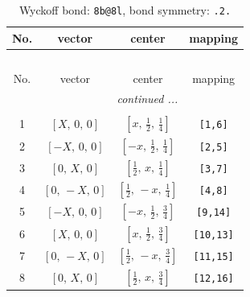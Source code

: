 \documentclass[fleqn,8pt]{jsarticle}
\begin{document}
\begin{longtable}{cccc}
\caption{Wyckoff bond: {\tt 8b@8l}, bond symmetry: {\tt .2.}}
 \\
 \hline \hline
No. & vector & center & mapping \\ \hline \endfirsthead

\multicolumn{3}{l}{\tablename\ \thetable{}} \\
 \hline \hline
No. & vector & center & mapping \\ \hline \endhead

 \hline \hline
\multicolumn{3}{r}{\footnotesize\it continued ...} \\ \endfoot

 \hline \hline
\multicolumn{3}{r}{} \\ \endlastfoot

1 & $\left[ X,\, 0,\, 0 \right]$ & $\left[ x,\, \frac{1}{2},\, \frac{1}{4} \right]$ & {\tt [1,6]} \\ \hline
2 & $\left[ - X,\, 0,\, 0 \right]$ & $\left[ - x,\, \frac{1}{2},\, \frac{1}{4} \right]$ & {\tt [2,5]} \\ \hline
3 & $\left[ 0,\, X,\, 0 \right]$ & $\left[ \frac{1}{2},\, x,\, \frac{1}{4} \right]$ & {\tt [3,7]} \\ \hline
4 & $\left[ 0,\, - X,\, 0 \right]$ & $\left[ \frac{1}{2},\, - x,\, \frac{1}{4} \right]$ & {\tt [4,8]} \\ \hline
5 & $\left[ - X,\, 0,\, 0 \right]$ & $\left[ - x,\, \frac{1}{2},\, \frac{3}{4} \right]$ & {\tt [9,14]} \\ \hline
6 & $\left[ X,\, 0,\, 0 \right]$ & $\left[ x,\, \frac{1}{2},\, \frac{3}{4} \right]$ & {\tt [10,13]} \\ \hline
7 & $\left[ 0,\, - X,\, 0 \right]$ & $\left[ \frac{1}{2},\, - x,\, \frac{3}{4} \right]$ & {\tt [11,15]} \\ \hline
8 & $\left[ 0,\, X,\, 0 \right]$ & $\left[ \frac{1}{2},\, x,\, \frac{3}{4} \right]$ & {\tt [12,16]} \\
\end{longtable}
\renewcommand{\arraystretch}{1.2}
\end{document}
